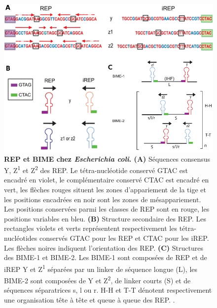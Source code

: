 \documentclass[12pt,a4paper]{report}
\begin{document}
\begin{onehalfspace}
\begin{figure}[ht]
\centerline{\includegraphics[scale=0.5]{figures/rep_bime.jpg}}
\caption{\textbf{REP et BIME chez \textit{Escherichia coli}. (A)} Séquences consensus Y, Z\textsuperscript{1} et Z\textsuperscript{2} des REP. Le tétra-nucléotide conservé GTAC est encadré en violet, le complémentaire conservé CTAC est encadré en vert, les flèches rouges situent les zones d'appariement de la tige et les positions encadrées en noir sont les zones de mésappariement. Les positions conservées parmi les classes de REP sont en rouge, les positions variables en bleu. \textbf{(B)} Structure secondaire des REP. Les rectangles violets et verts représentent respectivement les tétra-nucléotides conservés GTAC pour les REP et CTAC pour les iREP. Les flèches noires indiquent l'orientation des REP. \textbf{(C)} Structures des BIME-1 et BIME-2. Les BIME-1 sont composées de REP et de iREP Y et Z\textsuperscript{1} séparées par un linker de séquence longue (L), les BIME-2 sont composées de Y et Z\textsuperscript{2}, de linker courts (S) et de séquences séparatrices s, l ou r. H-H et T-T dénotent respectivement une organisation tête à tête et queue à queue des REP. \citep{Ton-Hoang2012}.}
\label{fig:rep_bime} 
\end{figure}


\end{onehalfspace}
\end{document}
